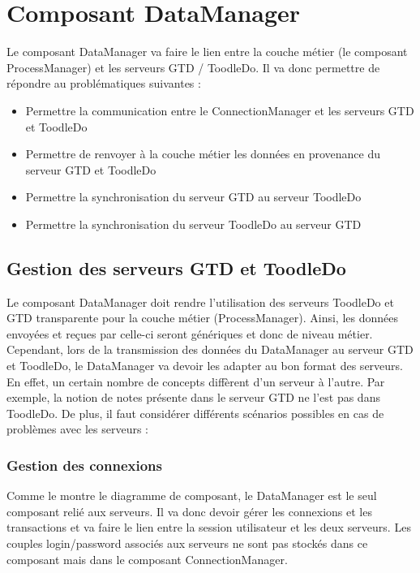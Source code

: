 
\section{Composant DataManager}


Le composant DataManager va faire le lien entre la couche métier (le composant
ProcessManager) et les serveurs GTD / ToodleDo. Il va donc permettre de répondre
au problématiques suivantes : \\

\begin{itemize}
 \item Permettre la communication entre le ConnectionManager et les serveurs GTD
 et ToodleDo
 \item Permettre de renvoyer à la couche métier les données en provenance du
 serveur GTD et ToodleDo
 \item Permettre la synchronisation du serveur GTD au serveur ToodleDo
 \item Permettre la synchronisation du serveur ToodleDo au serveur GTD\\
\end{itemize}




\subsection{Gestion des serveurs GTD et ToodleDo}

Le composant DataManager doit rendre l'utilisation des
serveurs ToodleDo et GTD transparente pour la couche métier (ProcessManager).
Ainsi, les données envoyées et reçues par celle-ci seront génériques et donc de
niveau métier. Cependant, lors de la transmission des données du DataManager au
serveur GTD et ToodleDo, le DataManager va devoir les adapter au bon format des
serveurs. En effet, un certain nombre de concepts diffèrent d'un serveur à l'autre. 
Par exemple, la notion de notes présente dans le serveur GTD ne l'est pas dans ToodleDo. 
De plus, il faut considérer différents scénarios possibles en cas de problèmes
avec les serveurs :


\subsubsection*{Gestion des connexions}

Comme le montre le diagramme de composant, le DataManager est le seul composant
relié aux serveurs. Il va donc devoir gérer les connexions et les transactions et va faire le lien entre la session utilisateur et les deux serveurs. Les couples login/password associés aux serveurs ne sont pas stockés dans ce composant mais dans le composant ConnectionManager.




